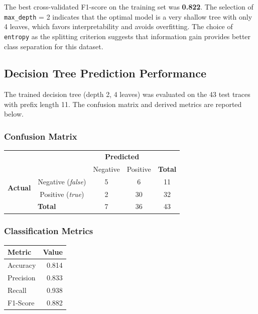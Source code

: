 \documentclass{article}
\begin{document}
\noindent
The best cross-validated F1-score on the training set was \textbf{0.822}. The selection of \texttt{max\_depth} = 2 indicates that the optimal model is a very shallow tree with only 4 leaves, which favors interpretability and avoids overfitting. The choice of \texttt{entropy} as the splitting criterion suggests that information gain provides better class separation for this dataset.

\subsection{Decision Tree Prediction Performance}

The trained decision tree (depth 2, 4 leaves) was evaluated on the 43 test traces with prefix length 11. The confusion matrix and derived metrics are reported below.

\subsubsection{Confusion Matrix}

\begin{center}
\begin{tabular}{cc|c|c|c}
& \multicolumn{1}{c}{} & \multicolumn{2}{c}{\textbf{Predicted}} & \\
& \multicolumn{1}{c}{} & \multicolumn{1}{c}{Negative}  & \multicolumn{1}{c}{Positive} & \multicolumn{1}{c}{\textbf{Total}} \\\cline{3-4}
\multirow{2}{*}{\textbf{Actual}} & Negative (\textit{false}) & 5 & 6 & 11 \\\cline{3-4}
                        & Positive (\textit{true})  & 2 & 30 & 32 \\\cline{3-4}
\multicolumn{2}{c|}{\textbf{Total}} & 7 & 36 & 43 \\
\end{tabular}
\end{center}

\subsubsection{Classification Metrics}

\begin{center}
\begin{tabular}{lr}
\toprule
\textbf{Metric} & \textbf{Value} \\
\midrule
Accuracy  & 0.814 \\
Precision & 0.833 \\
Recall    & 0.938 \\
F1-Score  & 0.882 \\
\bottomrule
\end{tabular}
\end{center}
\end{document}
